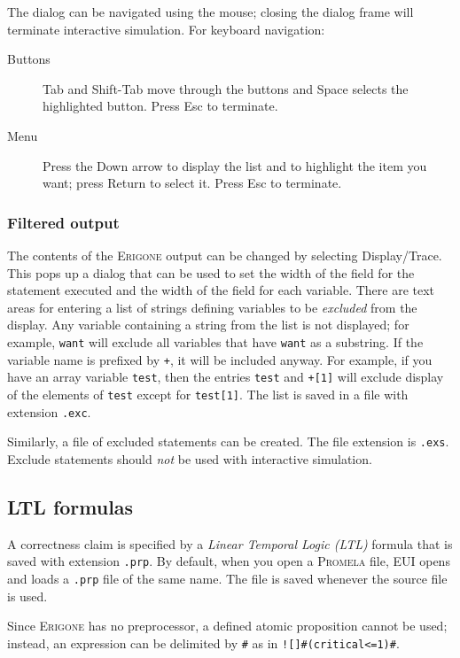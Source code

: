 \documentclass[11pt]{article}
\newcommand{\eri}{\textsc{Erigone}}
\newcommand{\prm}{\textsc{Promela}}
\newcommand{\eui}{\textsc{EUI}}
\newcommand{\p}[1]{\texttt{#1}}
\newcommand{\bu}[1]{\textsf{#1}}
\begin{document}
The dialog can be navigated using the mouse; closing the dialog frame
will terminate interactive simulation. For keyboard navigation:
\begin{description}
\item[Buttons] \bu{Tab} and \bu{Shift-Tab} move through the buttons
and \bu{Space} selects the highlighted button. Press \bu{Esc} to terminate.
\item[Menu] Press the \bu{Down arrow} to display the list and to highlight the
item you want; press \bu{Return} to select it. Press \bu{Esc} to terminate.
\end{description}

\subsubsection{Filtered output}\label{s.filter}
The contents of the \eri{} output can be changed by selecting 
\bu{Display/Trace}. This pops up a dialog that can be used to set the
width of the field for the statement executed and the width of the field
for each variable. There are text areas for entering a list of strings defining 
variables to be \emph{excluded} from the display. Any variable containing 
a string from the list is not displayed; for example, \p{want} will 
exclude all variables that have \p{want} as a substring. If the variable name is 
prefixed by \p{+}, it will be included anyway. For example, if you have an 
array variable \p{test}, then the entries \p{test} and \p{+[1]} will 
exclude display of the elements of \p{test} except for \p{test[1]}. The 
list is saved in a file with extension \p{.exc}.

Similarly, a file of excluded statements can be created. The file 
extension is \p{.exs}. \bu{Exclude statements} should \emph{not} be used with 
interactive simulation.

\subsection{LTL formulas}
A correctness claim is specified by a \emph{Linear Temporal Logic (LTL)}
formula that is saved with extension \p{.prp}.
By default, when you open a \prm{} file,
\eui{} opens and loads a \p{.prp} file of the same name.
The file is saved whenever the source file is used.

Since \eri{} has no preprocessor, a defined atomic proposition cannot
be used; instead, an expression can be delimited by \verb+#+ as in
\verb+![]#(critical<=1)#+.
\end{document}
